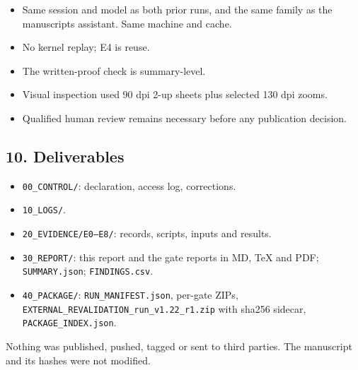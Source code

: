 \documentclass[
]{article}
\providecommand{\tightlist}{%
  \setlength{\itemsep}{0pt}\setlength{\parskip}{0pt}}
\begin{document}
\begin{itemize}
\tightlist
\item
  Same session and model as both prior runs, and the same family as the
  manuscript\textquotesingle s assistant. Same machine and cache.
\item
  No kernel replay; E4 is reuse.
\item
  The written-proof check is summary-level.
\item
  Visual inspection used 90 dpi 2-up sheets plus selected 130 dpi zooms.
\item
  Qualified human review remains necessary before any publication
  decision.
\end{itemize}

\subsection{10. Deliverables}\label{10-deliverables}

\begin{itemize}
\tightlist
\item
  \texttt{00\_CONTROL/}: declaration, access log, corrections.
\item
  \texttt{10\_LOGS/}.
\item
  \texttt{20\_EVIDENCE/E0–E8/}: records, scripts, inputs and results.
\item
  \texttt{30\_REPORT/}: this report and the gate reports in MD, TeX and
  PDF; \texttt{SUMMARY.json}; \texttt{FINDINGS.csv}.
\item
  \texttt{40\_PACKAGE/}: \texttt{RUN\_MANIFEST.json}, per-gate ZIPs,
  \texttt{EXTERNAL\_REVALIDATION\_run\_v1.22\_r1.zip} with sha256
  sidecar, \texttt{PACKAGE\_INDEX.json}.
\end{itemize}

Nothing was published, pushed, tagged or sent to third parties. The
manuscript and its hashes were not modified.
\end{document}
